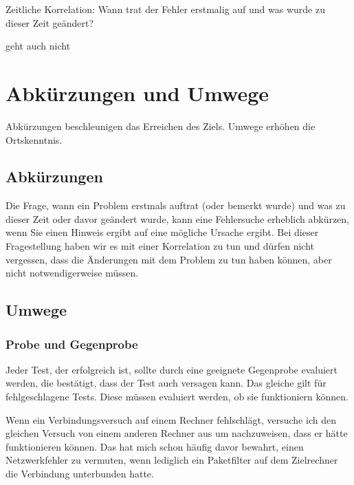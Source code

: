 \begin{notes}
\item Zeitliche Korrelation: Wann trat der Fehler erstmalig auf und was wurde
  zu dieser Zeit geändert?
\item geht auch nicht
\end{notes}

\section{Abkürzungen und Umwege}
\label{sec:abkuerzung-umweg}

\begin{abstractsec}
  Abkürzungen beschleunigen das Erreichen des Ziels. Umwege erhöhen die
  Ortskenntnis.
\end{abstractsec}

\begin{normaltext}

\subsection{Abkürzungen}
\label{sec:abkuerzungen}

Die Frage, wann ein Problem erstmals auftrat (oder bemerkt wurde) und was zu
dieser Zeit oder davor geändert wurde, kann eine Fehlersuche erheblich
abkürzen, wenn Sie einen Hinweis ergibt auf eine mögliche Ursache ergibt. Bei
dieser Fragestellung haben wir es mit einer Korrelation zu tun und dürfen
nicht vergessen, dass die Änderungen mit dem Problem zu tun haben können, aber
nicht notwendigerweise müssen.

\subsection{Umwege}
\label{sec:umwege}

\subsubsection{Probe und Gegenprobe}

Jeder Test, der erfolgreich ist, sollte durch eine geeignete Gegenprobe
evaluiert werden, die bestätigt, dass der Test auch versagen kann. Das gleiche
gilt für fehlgeschlagene Tests. Diese müssen evaluiert werden, ob sie
funktioniern können.

Wenn ein Verbindungsversuch auf einem Rechner fehlschlägt, versuche ich den
gleichen Versuch von einem anderen Rechner aus um nachzuweisen, dass er hätte
funktionieren können. Das hat mich schon häufig davor bewahrt, einen
Netzwerkfehler zu vermuten, wenn lediglich ein Paketfilter auf dem Zielrechner
die Verbindung unterbunden hatte.
\end{normaltext}


